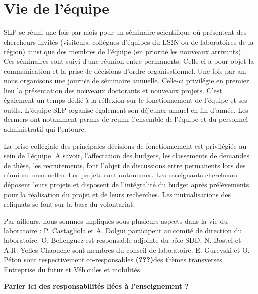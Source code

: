 \section{Vie de l'équipe}\label{slp:vieequipe}

SLP se réuni une fois par mois pour un séminaire scientifique où présentent des chercheurs invités (visiteurs, collègues d'équipes du LS2N ou de laboratoires de la région) ainsi que des membres de l'équipe (en priorité les nouveaux arrivants). 
Ces séminaires sont suivi d'une réunion entre permanents. Celle-ci a pour objet la communication et la prise de décisions d'ordre organisationnel. 
Une fois par an, nous organisons une journée de séminaire annuelle. Celle-ci  privilégie en premier lieu la présentation des nouveaux doctorants et nouveaux projets. C'est également un temps dédié à la réflexion sur le fonctionnement de l'équipe et ses outils.
L'équipe SLP organise également son déjeuner annuel en fin d'année. Les derniers ont notamment permis de réunir l'ensemble de l'équipe et du personnel administratif qui l'entoure.

La prise collégiale des principales décisions de fonctionnement est privilégiée au sein de l'équipe. A savoir, l'affectation des budgets, les classements de demandes de thèse, les recrutements, font l'objet de discussions entre permanents lors des réunions mensuelles. 
Les projets sont autonomes. Les enseignants-chercheurs déposent leurs projets et disposent de l'intégralité du budget après prélèvements pour la réalisation du projet et de leurs recherches. Les mutualisations des reliquats se font sur la base du volontariat.

Par ailleurs, nous sommes impliqués sous plusieurs aspects dans la vie du laboratoire :
P. Castagliola et A. Dolgui participent au comité de direction du laboratoire. 
O. Bellenguez est responsable adjointe du pôle SDD. 
N. Bostel et A.R. Yelles Chaouche sont membres du conseil de laboratoire. 
E. Gurevski et O. Péton sont respectivement co-responsables \textbf{(???)}des thèmes transverses Entreprise du futur et Véhicules et mobilités.

\textbf{Parler ici des responsabilités liées à l'enseignement ?}


